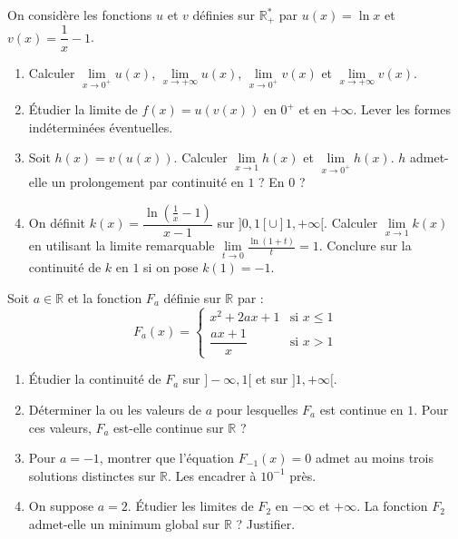 \documentclass[11pt]{article}
\begin{document}
\begin{exercice}
On considère les fonctions $u$ et $v$ définies sur $\mathbb{R}^*_+$ par $u(x) = \ln x$ et $v(x) = \dfrac{1}{x} - 1$.
\begin{enumerate}
    \item Calculer $\lim\limits_{x \to 0^+} u(x)$, $\lim\limits_{x \to +\infty} u(x)$, $\lim\limits_{x \to 0^+} v(x)$ et $\lim\limits_{x \to +\infty} v(x)$.
    \item Étudier la limite de $f(x) = u(v(x))$ en $0^+$ et en $+\infty$. Lever les formes indéterminées éventuelles.
    \item Soit $h(x) = v(u(x))$. Calculer $\lim\limits_{x \to 1} h(x)$ et $\lim\limits_{x \to 0^+} h(x)$. $h$ admet-elle un prolongement par continuité en $1$ ? En $0$ ?
    \item On définit $k(x) = \dfrac{\ln\left(\frac{1}{x} - 1\right)}{x - 1}$ sur $]0, 1[ \cup ]1, +\infty[$. Calculer $\lim\limits_{x \to 1} k(x)$ en utilisant la limite remarquable $\lim\limits_{t \to 0} \frac{\ln(1+t)}{t} = 1$. Conclure sur la continuité de $k$ en $1$ si on pose $k(1) = -1$.
\end{enumerate}
\end{exercice}

\begin{exercice}
Soit $a \in \mathbb{R}$ et la fonction $F_a$ définie sur $\mathbb{R}$ par :
\[
F_a(x) = \begin{cases}
x^2 + 2ax + 1 & \text{si } x \leq 1 \\
\dfrac{ax + 1}{x} & \text{si } x > 1
\end{cases}
\]
\begin{enumerate}
    \item Étudier la continuité de $F_a$ sur $]-\infty, 1[$ et sur $]1, +\infty[$.
    \item Déterminer la ou les valeurs de $a$ pour lesquelles $F_a$ est continue en $1$. Pour ces valeurs, $F_a$ est-elle continue sur $\mathbb{R}$ ?
    \item Pour $a = -1$, montrer que l'équation $F_{-1}(x) = 0$ admet au moins trois solutions distinctes sur $\mathbb{R}$. Les encadrer à $10^{-1}$ près.
    \item On suppose $a = 2$. Étudier les limites de $F_2$ en $-\infty$ et $+\infty$. La fonction $F_2$ admet-elle un minimum global sur $\mathbb{R}$ ? Justifier.
\end{enumerate}
\end{exercice}
\end{document}
